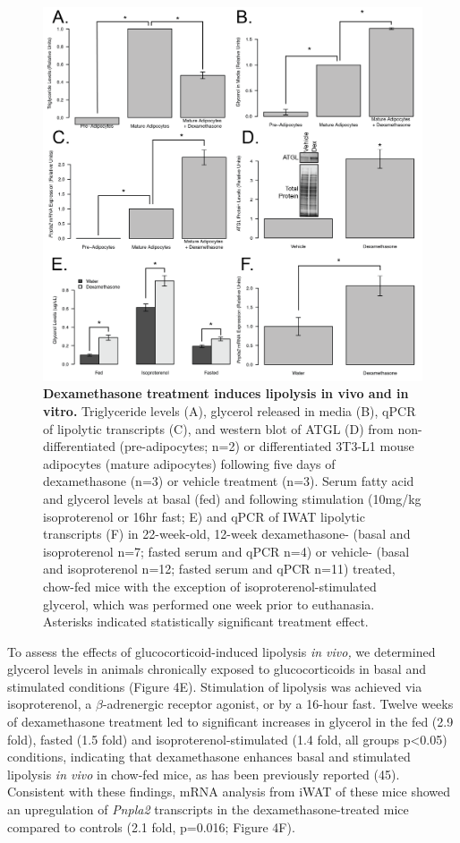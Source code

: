 \documentclass[11pt]{article} %
\begin{document}
\begin{figure}
  \begin{center}
    \includegraphics[width=\textwidth]{Figures_Figure_4.png}
  \end{center}
  \caption{\textbf{ Dexamethasone treatment induces lipolysis in vivo and in vitro.}  Triglyceride levels (A), glycerol released in media (B), qPCR of lipolytic transcripts (C), and western blot of ATGL (D) from non-differentiated (pre-adipocytes; n=2) or differentiated 3T3-L1 mouse adipocytes (mature adipocytes) following five days of dexamethasone (n=3) or vehicle treatment (n=3). Serum fatty acid and glycerol levels at basal (fed) and following stimulation (10mg/kg isoproterenol or 16hr fast; E) and qPCR of IWAT lipolytic transcripts (F) in 22-week-old, 12-week dexamethasone- (basal and isoproterenol n=7; fasted serum and qPCR n=4) or vehicle- (basal and isoproterenol n=12; fasted serum and qPCR n=11) treated, chow-fed mice with the exception of isoproterenol-stimulated glycerol, which was performed one week prior to euthanasia. Asterisks indicated statistically significant treatment effect.}
 \label{fig:4}
\end{figure}

To assess the effects of glucocorticoid-induced lipolysis \emph{in
vivo,} we determined glycerol levels in animals chronically exposed to
glucocorticoids in basal and stimulated conditions (Figure 4E).
Stimulation of lipolysis was achieved via isoproterenol, a $\beta$-adrenergic
receptor agonist, or by a 16-hour fast. Twelve weeks of dexamethasone
treatment led to significant increases in glycerol in the fed (2.9
fold), fasted (1.5 fold) and isoproterenol-stimulated (1.4 fold, all
groups p\textless{}0.05) conditions, indicating that dexamethasone
enhances basal and stimulated lipolysis \emph{in vivo} in chow-fed mice,
as has been previously reported (45). Consistent with these findings,
mRNA analysis from iWAT of these mice showed an upregulation of
\emph{Pnpla2} transcripts in the dexamethasone-treated mice compared to
controls (2.1 fold, p=0.016; Figure 4F).
\end{document}
